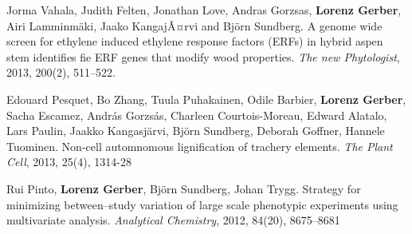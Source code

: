 \documentclass[10pt]{article}
\begin{document}
\begin{bibenum}
                                                                                           \item Jorma Vahala, Judith Felten, Jonathan Love, Andras Gorzsas,
                                                                                             \textbf{Lorenz Gerber}, Airi Lamminm\"{a}ki, Jaako KangajÃ¤rvi and Bj\"{o}rn
                                                                                             Sundberg.
                                                                                             A genome wide screen for ethylene induced ethylene response factors (ERFs) in hybrid aspen
                                                                                             stem identifies fie ERF genes that modify wood properties.
                                                                                             \textit{The new Phytologist}, 2013, 200(2), 511--522.\\


                                                                                           \item Edouard Pesquet, Bo Zhang, Tuula Puhakainen, Odile Barbier,
                                                                                             \textbf{Lorenz Gerber}, Sacha Escamez, Andr\'{a}s Gorzs\'{a}s,
                                                                                             Charleen Courtois-Moreau, Edward Alatalo, Lars Paulin,
                                                                                             Jaakko Kangasj\"arvi, Bj\"{o}rn Sundberg, Deborah Goffner,
                                                                                             Hannele Tuominen. Non-cell automnomous lignification of
                                                                                             trachery elements. \textit{The Plant Cell}, 2013, 25(4), 1314-28\\


                                                                                           \item Rui Pinto, \textbf{Lorenz Gerber}, Bj\"{o}rn Sundberg,
                                                                                             Johan Trygg. Strategy for minimizing between--study variation of large
                                                                                             scale phenotypic experiments using multivariate analysis.
                                                                                             \emph{Analytical Chemistry}, 2012, 84(20), 8675--8681\\



\end{bibenum}
\end{document}
